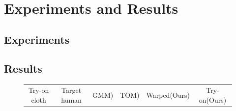 \section{Experiments and Results }  \label{section:experimentresults}


\subsection{Experiments}





\subsection{Results}



\begin{figure}[t]
   \centering
\begin{tabular}{cc|cc|cc}

Try-on cloth&Target human&GMM\cite{Wang2018TowardCI})&TOM\cite{Wang2018TowardCI})&Warped(Ours)&Try-on(Ours)\\


\end{tabular}
\end{figure}
